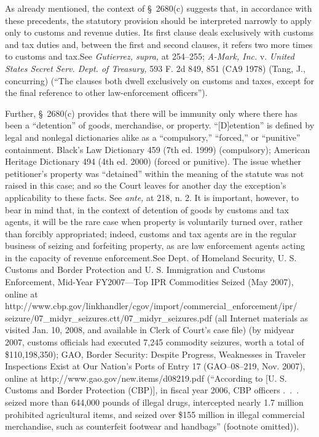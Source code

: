   As already mentioned, the context of \S~2680(c) suggests that, in accordance with these precedents, the statutory provision should be interpreted narrowly to apply only to customs and revenue duties. Its first clause deals exclusively with customs and tax duties and, between the first and second clauses, it refers two more times to customs and tax.See \emph{Gutierrez, supra,} at 254--255; \emph{A-Mark, Inc.} v. \emph{United States Secret Serv. Dept. of Treasury,} 593 F. 2d 849, 851 (CA9 1978) (Tang, J., concurring) (``The clauses both dwell exclusively on customs and taxes, except for the final reference to other law-enforcement officers'').

  Further, \S~2680(c) provides that there will be immunity only where there has been a ``detention'' of goods, merchandise, or property. ``[D]etention'' is defined by legal and nonlegal dictionaries alike as a ``compulsory,'' ``forced,'' or ``punitive'' containment. Black's Law Dictionary 459 (7th ed. 1999) (compulsory); American Heritage Dictionary 494 (4th ed. 2000) (forced or punitive). The issue whether petitioner's property was ``detained'' within the meaning of the statute was not raised in this case; and so the Court leaves for another day the exception's applicability to these facts. See \emph{ante,} at 218, n. 2. It is important, however, to bear in mind that, in the context of detention of goods by customs and tax agents, it will be the rare case when property is voluntarily turned over, rather than forcibly appropriated; indeed, customs and tax agents are in the regular business of seizing and forfeiting property, as are law enforcement agents acting in the capacity of revenue enforcement.See Dept. of Homeland Security, U. S. Customs and Border Protection and U. S. Immigration and Customs Enforcement, Mid-Year FY2007---Top IPR Commodities Seized (May 2007), online at http://www.cbp.gov/linkhandler/cgov/import/commercial_enforcement/ipr/ seizure/07_midyr_seizures.ctt/07_midyr_seizures.pdf (all Internet materials as visited Jan. 10, 2008, and available in \newpage  Clerk of Court's case file) (by midyear 2007, customs officials had executed 7,245 commodity seizures, worth a total of \$110,198,350); GAO, Border Security: Despite Progress, Weaknesses in Traveler Inspections Exist at Our Nation's Ports of Entry 17 (GAO--08--219, Nov. 2007), online at http://www.gao.gov/new.items/d08219.pdf (``According to [U. S. Customs and Border Protection (CBP)], in fiscal year 2006, CBP officers .~.~. seized more than 644,000 pounds of illegal drugs, intercepted nearly 1.7 million prohibited agricultural items, and seized over \$155 million in illegal commercial merchandise, such as counterfeit footwear and handbags'' (footnote omitted)).

